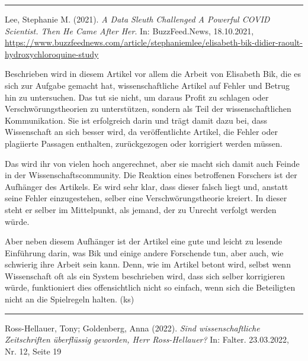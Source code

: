 \documentclass[a4paper,
fontsize=11pt,
oneside,
numbers=noperiodatend,
parskip=half-,
bibliography=totoc,
final
]{scrartcl}
\begin{document}
\begin{center}\rule{0.5\linewidth}{0.5pt}\end{center}

Lee, Stephanie M. (2021). \emph{A Data Sleuth Challenged A Powerful
COVID Scientist. Then He Came After Her}. In: BuzzFeed.News, 18.10.2021,
\url{https://www.buzzfeednews.com/article/stephaniemlee/elisabeth-bik-didier-raoult-hydroxychloroquine-study}

Beschrieben wird in diesem Artikel vor allem die Arbeit von Elisabeth
Bik, die es sich zur Aufgabe gemacht hat, wissenschaftliche Artikel auf
Fehler und Betrug hin zu untersuchen. Das tut sie nicht, um daraus
Profit zu schlagen oder Verschwörungstheorien zu unterstützen, sondern
als Teil der wissenschaftlichen Kommunikation. Sie ist erfolgreich darin
und trägt damit dazu bei, dass Wissenschaft an sich besser wird, da
veröffentlichte Artikel, die Fehler oder plagiierte Passagen enthalten,
zurückgezogen oder korrigiert werden müssen.

Das wird ihr von vielen hoch angerechnet, aber sie macht sich damit auch
Feinde in der Wissenschaftscommunity. Die Reaktion eines betroffenen
Forschers ist der Aufhänger des Artikels. Es wird sehr klar, dass dieser
falsch liegt und, anstatt seine Fehler einzugestehen, selber eine
Verschwörungstheorie kreiert. In dieser steht er selber im Mittelpunkt,
als jemand, der zu Unrecht verfolgt werden würde.

Aber neben diesem Aufhänger ist der Artikel eine gute und leicht zu
lesende Einführung darin, was Bik und einige andere Forschende tun, aber
auch, wie schwierig ihre Arbeit sein kann. Denn, wie im Artikel betont
wird, selbst wenn Wissenschaft oft als ein System beschrieben wird, dass
sich selber korrigieren würde, funktioniert dies offensichtlich nicht so
einfach, wenn sich die Beteiligten nicht an die Spielregeln halten. (ks)

\begin{center}\rule{0.5\linewidth}{0.5pt}\end{center}

Ross-Hellauer, Tony; Goldenberg, Anna (2022). \emph{Sind
wissenschaftliche Zeitschriften überflüssig geworden, Herr
Ross-Hellauer?} In: Falter. 23.03.2022, Nr. 12, Seite 19
\end{document}
